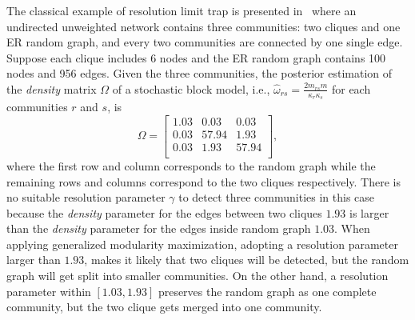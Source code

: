 The classical example of resolution limit trap is presented in~\cite{lancichinetti2011limits} where an undirected unweighted network contains three communities: two cliques and one ER random graph, and every two communities are connected by one single edge. Suppose each clique includes 6 nodes and the ER random graph contains 100 nodes and 956 edges. Given the three communities, the posterior estimation of the {\it density} matrix $\Omega$ of a stochastic block model, i.e., $\hat{\omega}_{rs} = \frac{2 m_{rs} m}{\kappa_r \kappa_s}$ for each communities $r$ and $s$, is
\begin{equation}
    \Omega = \begin{bmatrix}
    1.03	& 0.03  &	0.03	\\
    0.03	& 57.94 &	1.93  \\
    0.03	& 1.93  &	57.94 \\
    \end{bmatrix},
\end{equation}
where the first row and column corresponds to the random graph while the remaining rows and columns correspond to the two cliques respectively. There is no suitable resolution parameter $\gamma$ to detect three communities in this case because the {\it density} parameter for the edges between two cliques $1.93$ is larger than the {\it density} parameter for the edges inside random graph $1.03$. When applying generalized modularity maximization, adopting a resolution parameter larger than $1.93$, makes it likely that two cliques will be detected, but the random graph will get split into smaller communities. On the other hand, a resolution parameter within $[1.03, 1.93]$ preserves the random graph as one complete community, but the two clique gets merged into one community.

